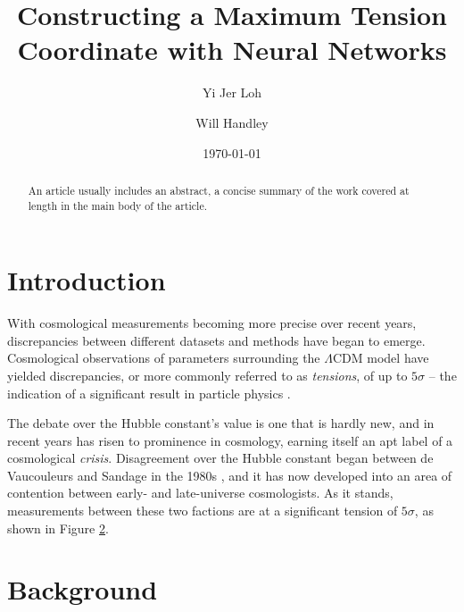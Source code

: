 \documentclass[%
 reprint,
 amsmath,amssymb,
 aps,
]{revtex4-2}
\begin{document}

\title{Constructing a Maximum Tension Coordinate with Neural Networks}

\author{Yi Jer Loh}
\author{Will Handley}
%

\date{\today}

\begin{abstract}
An article usually includes an abstract, a concise summary of the work
covered at length in the main body of the article. 
\end{abstract}

\maketitle



\section{\label{sec:level1}Introduction}

With cosmological measurements becoming more precise over recent years, discrepancies between different datasets and methods have began to emerge. Cosmological observations of parameters surrounding the $\Lambda \textrm{CDM}$ model have yielded discrepancies, or more commonly referred to as \textit{tensions}, of up to $5\sigma$ -- the indication of a significant result in particle physics \cite{Franklin2013}. 

The debate over the Hubble constant's value is one that is hardly new, and in recent years has risen to prominence in cosmology, earning itself an apt label of a cosmological \textit{crisis}. Disagreement over the Hubble constant began between de Vaucouleurs and Sandage in the 1980s \cite{deVaucouleurs1986, Sandage1975}, and it has now developed into an area of contention between early- and late-universe cosmologists. As it stands, measurements between these two factions are at a significant tension of $5\sigma$, as shown in Figure \ref{}. 



\section{Background}
\end{document}
